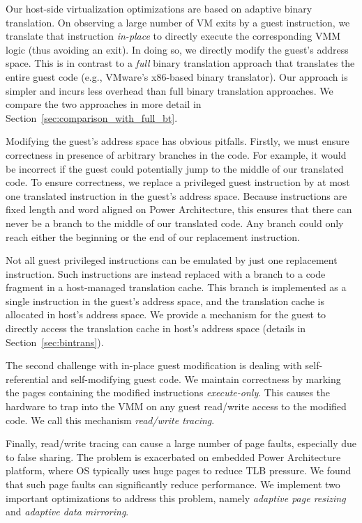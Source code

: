\documentclass[10pt,twocolumn]{article}
\begin{document}
Our host-side virtualization optimizations are based on adaptive binary
translation. On observing a large number of VM exits by a guest instruction, we translate
that instruction {\em in-place} to directly execute the corresponding
VMM logic (thus avoiding an exit). In doing so, we directly modify the guest's
address space. This is in contrast to a {\em full} binary translation approach
that translates the entire guest code
(e.g., VMware's x86-based binary translator\cite{adams:asplos06}). Our approach is
simpler and incurs less overhead than full binary
translation approaches. We compare the two approaches in more detail in
Section~\ref{sec:comparison_with_full_bt}.

Modifying the guest's address space has obvious pitfalls.
Firstly, we must ensure correctness in presence
of arbitrary branches in the code. For example, it would be incorrect if the guest
could potentially jump to the middle of our translated code.
To ensure correctness, we replace a privileged guest instruction
by at most one translated instruction in the guest's address space. Because instructions
are fixed length and word aligned on Power Architecture, this ensures that
there can never be a branch to the middle of our translated
code. Any branch could only reach either the beginning or the end of our
replacement instruction.

Not all guest privileged instructions can be emulated by just one
replacement instruction.
Such instructions are instead replaced with a branch to a code
fragment in a host-managed translation cache. This branch is implemented as a
single instruction in the guest's address space, and the translation
cache is allocated in host's address space. We provide a mechanism for the guest
to directly access the translation cache in host's address
space (details in Section~\ref{sec:bintrans}).

The second challenge with in-place guest modification is dealing with
self-referential and self-modifying guest code. We maintain correctness by 
marking the pages containing the modified instructions {\em execute-only}. This
causes the hardware to trap into the VMM on any guest read/write access to the
modified code. We call this mechanism {\em read/write tracing}.

Finally, read/write tracing can cause a large number of
page faults, especially due to false sharing. The problem is
exacerbated on embedded Power Architecture platform, where OS typically uses
huge pages to reduce TLB pressure. We found that such page faults can
significantly reduce performance.
We implement two important optimizations to address this problem, namely
{\em adaptive page resizing} and {\em adaptive data mirroring}.
\end{document}
